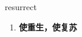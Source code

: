 
\begin{frame}
{\huge resurrect}
\begin{center}
\begin{enumerate}\Large
  \item \textbf{使重生，使复苏}
\end{enumerate}
\end{center}
\end{frame}

